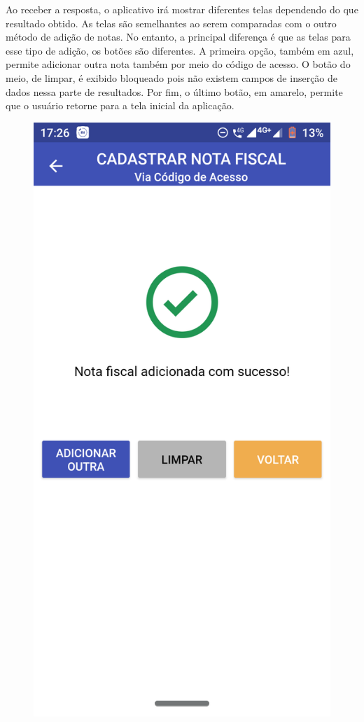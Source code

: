 Ao receber a resposta, o aplicativo irá mostrar diferentes telas dependendo do que resultado obtido. As telas são semelhantes ao serem comparadas com o outro método de adição de notas. No entanto, a principal diferença é que as telas para esse tipo de adição, os botões são diferentes. A primeira opção, também em azul, permite adicionar outra nota também por meio do código de acesso. O botão do meio, de limpar, é exibido bloqueado pois não existem campos de inserção de dados nessa parte de resultados. Por fim, o último botão, em amarelo, permite que o usuário retorne para a tela inicial da aplicação.

\newpage
\begin{figure}[h]
    \centering
    \includegraphics[scale=0.15]{tcc/figures/app/app_codigo_acesso_sucesso.png}

\end{figure}
